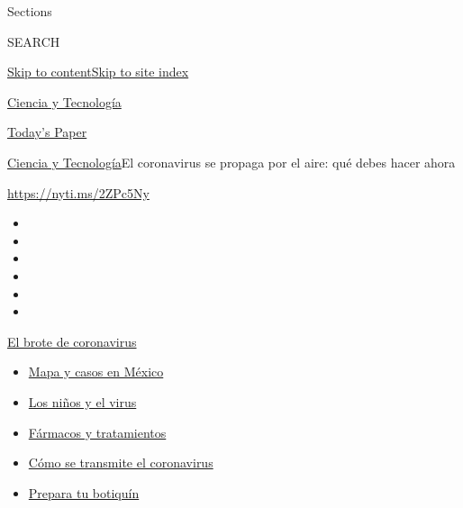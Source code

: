 Sections

SEARCH

\protect\hyperlink{site-content}{Skip to
content}\protect\hyperlink{site-index}{Skip to site index}

\href{https://www.nytimes3xbfgragh.onion/es/section/ciencia-y-tecnologia}{Ciencia
y Tecnología}

\href{https://myaccount.nytimes3xbfgragh.onion/auth/login?response_type=cookie\&client_id=vi}{}

\href{https://www.nytimes3xbfgragh.onion/section/todayspaper}{Today's
Paper}

\href{/es/section/ciencia-y-tecnologia}{Ciencia y
Tecnología}\textbar{}El coronavirus se propaga por el aire: qué debes
hacer ahora

\url{https://nyti.ms/2ZPc5Ny}

\begin{itemize}
\item
\item
\item
\item
\item
\item
\end{itemize}

\href{https://www.nytimes3xbfgragh.onion/es/spotlight/coronavirus?action=click\&pgtype=Article\&state=default\&region=TOP_BANNER\&context=storylines_menu}{El
brote de coronavirus}

\begin{itemize}
\tightlist
\item
  \href{https://www.nytimes3xbfgragh.onion/es/interactive/2020/espanol/america-latina/coronavirus-en-mexico.html?action=click\&pgtype=Article\&state=default\&region=TOP_BANNER\&context=storylines_menu}{Mapa
  y casos en México}
\item
  \href{https://www.nytimes3xbfgragh.onion/es/2020/07/31/espanol/ciencia-y-tecnologia/ninos-contagio-coronavirus.html?action=click\&pgtype=Article\&state=default\&region=TOP_BANNER\&context=storylines_menu}{Los
  niños y el virus}
\item
  \href{https://www.nytimes3xbfgragh.onion/es/interactive/2020/science/coronavirus-tratamientos-curas.html?action=click\&pgtype=Article\&state=default\&region=TOP_BANNER\&context=storylines_menu}{Fármacos
  y tratamientos}
\item
  \href{https://www.nytimes3xbfgragh.onion/es/2020/07/06/espanol/ciencia-y-tecnologia/coronavirus-transmision-aire.html?action=click\&pgtype=Article\&state=default\&region=TOP_BANNER\&context=storylines_menu}{Cómo
  se transmite el coronavirus}
\item
  \href{https://www.nytimes3xbfgragh.onion/es/2020/07/14/espanol/estilos-de-vida/botiquin-medicina-coronavirus.html?action=click\&pgtype=Article\&state=default\&region=TOP_BANNER\&context=storylines_menu}{Prepara
  tu botiquín}
\end{itemize}

